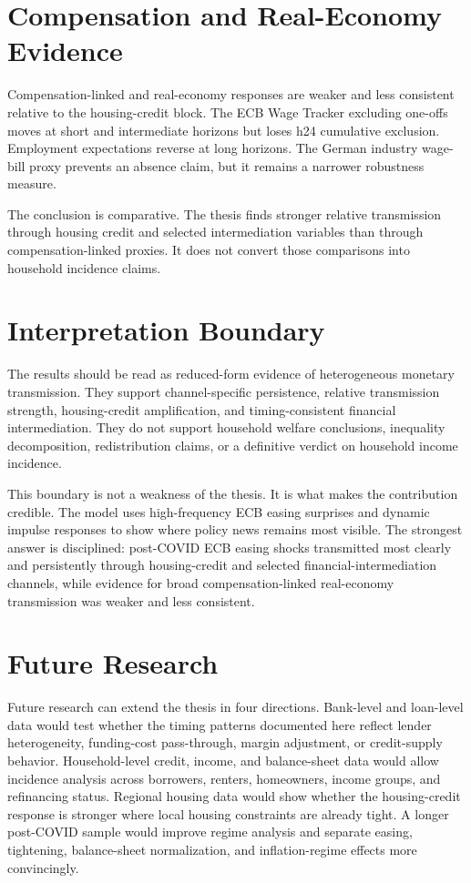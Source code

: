 \section{Compensation and Real-Economy Evidence}

Compensation-linked and real-economy responses are weaker and less consistent relative to the housing-credit block. The ECB Wage Tracker excluding one-offs moves at short and intermediate horizons but loses h24 cumulative exclusion. Employment expectations reverse at long horizons. The German industry wage-bill proxy prevents an absence claim, but it remains a narrower robustness measure.

The conclusion is comparative. The thesis finds stronger relative transmission through housing credit and selected intermediation variables than through compensation-linked proxies. It does not convert those comparisons into household incidence claims.

\section{Interpretation Boundary}

The results should be read as reduced-form evidence of heterogeneous monetary transmission. They support channel-specific persistence, relative transmission strength, housing-credit amplification, and timing-consistent financial intermediation. They do not support household welfare conclusions, inequality decomposition, redistribution claims, or a definitive verdict on household income incidence.

This boundary is not a weakness of the thesis. It is what makes the contribution credible. The model uses high-frequency ECB easing surprises and dynamic impulse responses to show where policy news remains most visible. The strongest answer is disciplined: post-COVID ECB easing shocks transmitted most clearly and persistently through housing-credit and selected financial-intermediation channels, while evidence for broad compensation-linked real-economy transmission was weaker and less consistent.

\section{Future Research}

Future research can extend the thesis in four directions. Bank-level and loan-level data would test whether the timing patterns documented here reflect lender heterogeneity, funding-cost pass-through, margin adjustment, or credit-supply behavior. Household-level credit, income, and balance-sheet data would allow incidence analysis across borrowers, renters, homeowners, income groups, and refinancing status. Regional housing data would show whether the housing-credit response is stronger where local housing constraints are already tight. A longer post-COVID sample would improve regime analysis and separate easing, tightening, balance-sheet normalization, and inflation-regime effects more convincingly.

